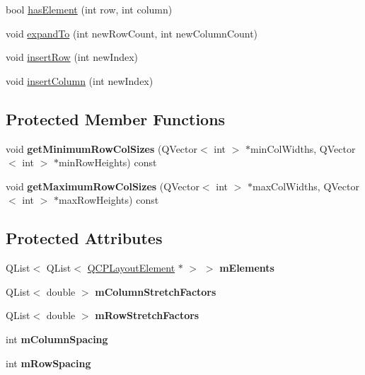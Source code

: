 \begin{DoxyCompactItemize}
\item 
bool \mbox{\hyperlink{class_q_c_p_layout_grid_ab0cf4f7edc9414a3bfaddac0f46dc0a0}{has\+Element}} (int row, int column)
\item 
void \mbox{\hyperlink{class_q_c_p_layout_grid_a886c0dcbabd51a45da399e044552b685}{expand\+To}} (int new\+Row\+Count, int new\+Column\+Count)
\item 
void \mbox{\hyperlink{class_q_c_p_layout_grid_a48af3dd7c3a653d9c3d7dd99bd02e838}{insert\+Row}} (int new\+Index)
\item 
void \mbox{\hyperlink{class_q_c_p_layout_grid_a1e880a321dbe8b43b471ccd764433dc4}{insert\+Column}} (int new\+Index)
\end{DoxyCompactItemize}
\subsection*{Protected Member Functions}
\begin{DoxyCompactItemize}
\item 
\mbox{\label{class_q_c_p_layout_grid_a4b9a251919936f127a63fc1b9911cd4e}} 
void {\bfseries get\+Minimum\+Row\+Col\+Sizes} (Q\+Vector$<$ int $>$ $\ast$min\+Col\+Widths, Q\+Vector$<$ int $>$ $\ast$min\+Row\+Heights) const
\item 
\mbox{\label{class_q_c_p_layout_grid_a9be77011ec5b5dfbe7fbda126659e1eb}} 
void {\bfseries get\+Maximum\+Row\+Col\+Sizes} (Q\+Vector$<$ int $>$ $\ast$max\+Col\+Widths, Q\+Vector$<$ int $>$ $\ast$max\+Row\+Heights) const
\end{DoxyCompactItemize}
\subsection*{Protected Attributes}
\begin{DoxyCompactItemize}
\item 
\mbox{\label{class_q_c_p_layout_grid_a3577d3855bf8ad20ef9079291a49f397}} 
Q\+List$<$ Q\+List$<$ \mbox{\hyperlink{class_q_c_p_layout_element}{Q\+C\+P\+Layout\+Element}} $\ast$ $>$ $>$ {\bfseries m\+Elements}
\item 
\mbox{\label{class_q_c_p_layout_grid_ac6aabe62339f94f18b9f8adab94b1840}} 
Q\+List$<$ double $>$ {\bfseries m\+Column\+Stretch\+Factors}
\item 
\mbox{\label{class_q_c_p_layout_grid_a36c85a7eaf342680fb9b8a4977486f16}} 
Q\+List$<$ double $>$ {\bfseries m\+Row\+Stretch\+Factors}
\item 
\mbox{\label{class_q_c_p_layout_grid_ae9ac48f0791be07ead0a96dbd5622770}} 
int {\bfseries m\+Column\+Spacing}
\item 
\mbox{\label{class_q_c_p_layout_grid_a8b67f183f4645739cc4c794d75843b40}} 
int {\bfseries m\+Row\+Spacing}
\end{DoxyCompactItemize}
